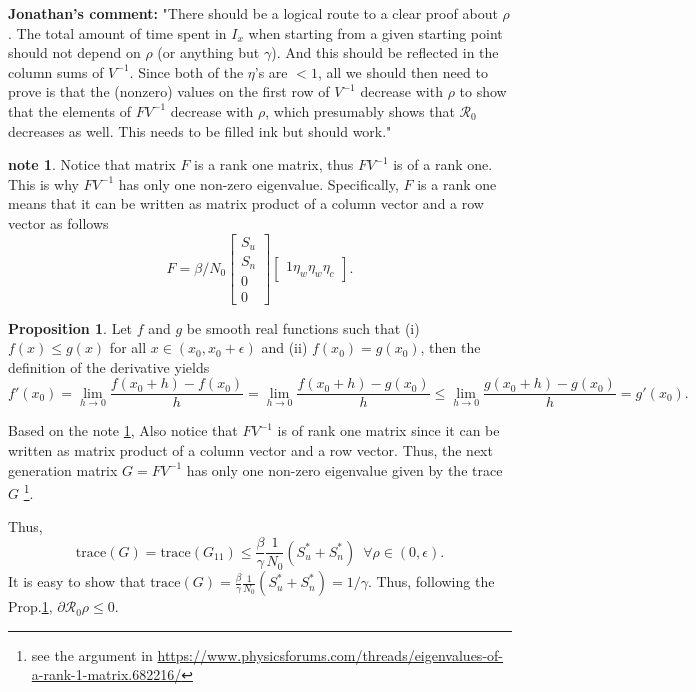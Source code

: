 \documentclass[12pt]{article}
\newcommand{\Rnum}{\mathcal{R}_0}
\theoremstyle{definition} %
\newtheorem{prop}{Proposition}
\newtheorem{note}{note}
\begin{document}
{\bf Jonathan's comment:} "There should be a logical route to a clear proof about $\rho$. The total
amount of time spent in $I_x$ when starting from a given starting point should not depend on $\rho$ (or anything but $\gamma$). And this should be reflected in the column sums of $V^{-1}$.
Since both of the $\eta$'s are $<1$, all we should then need to prove is that the (nonzero) values on the first row of $V^{-1}$ decrease with $\rho$ to show that the elements of $FV^{-1}$ decrease with $\rho$, which presumably shows that $\Rnum$ decreases as well. This needs to be filled ink but should work."

\begin{note}
\label{note:rankf}
Notice that matrix $F$ is a rank one matrix, thus $FV^{-1}$ is of a rank one. This is why $FV^{-1}$ has only one non-zero eigenvalue. Specifically, $F$ is a rank one means that it can be written as matrix product of a column vector and a row vector as follows
$$
F = \beta/N_0 \left[\begin{array}{c} S_u\\  S_n\\ 0\\ 0 \end {array} \right]
\left[\begin{array}{cccc} 1 \eta_w \eta_w \eta_c \end {array} \right].
$$
\end{note}

\begin{prop}\label{prop1}
Let $f$ and $g$ be smooth real functions such that (i) $f(x) \leq g(x)$ for all $x \in (x_0,x_0+\epsilon)$ and (ii) $f(x_0)=g(x_0)$, then the definition of the derivative yields
$$f'(x_0) = \lim_{h\to 0} \frac{f(x_0+h)-f(x_0)}{h} =
\lim_{h\to 0} \frac{f(x_0+h)-g(x_0)}{h} \leq
\lim_{h\to 0} \frac{g(x_0+h)-g(x_0)}{h} =
g'(x_0).
$$
\end{prop}

Based on the note \ref{note:rankf}, Also notice that $FV^{-1}$ is of rank one matrix since it can be written as matrix product of a column vector and a row vector. Thus, the next generation matrix $G=F V^{-1}$ has only one non-zero eigenvalue given by the trace $G$ \footnote {see the argument in  \url{https://www.physicsforums.com/threads/eigenvalues-of-a-rank-1-matrix.682216/}}.

Thus,
\begin{equation}
\mathrm{trace}(G) = \mathrm{trace}(G_{11})
\leq \frac{\beta}{\gamma} \frac{1}{N_0} (S_u^*+S_n^*) \, \, \,\forall \rho \in (0,\epsilon).
\end{equation}
It is easy to show that $\mathrm{trace}(G)= \frac{\beta}{\gamma} \frac{1}{N_0} (S_u^*+S_n^*) =1/\gamma$. Thus, following the Prop.\ref{prop1}, $\partial{\Rnum}{\rho} \leq 0$.
\end{document}
